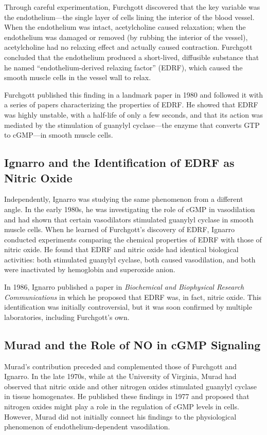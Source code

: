 Through careful experimentation, Furchgott discovered that the key variable was the endothelium---the single layer of cells lining the interior of the blood vessel. When the endothelium was intact, acetylcholine caused relaxation; when the endothelium was damaged or removed (by rubbing the interior of the vessel), acetylcholine had no relaxing effect and actually caused contraction. Furchgott concluded that the endothelium produced a short-lived, diffusible substance that he named ``endothelium-derived relaxing factor'' (EDRF), which caused the smooth muscle cells in the vessel wall to relax.

Furchgott published this finding in a landmark paper in 1980 and followed it with a series of papers characterizing the properties of EDRF. He showed that EDRF was highly unstable, with a half-life of only a few seconds, and that its action was mediated by the stimulation of guanylyl cyclase---the enzyme that converts GTP to cGMP---in smooth muscle cells.

\subsection{Ignarro and the Identification of EDRF as Nitric Oxide}

Independently, Ignarro was studying the same phenomenon from a different angle. In the early 1980s, he was investigating the role of cGMP in vasodilation and had shown that certain vasodilators stimulated guanylyl cyclase in smooth muscle cells. When he learned of Furchgott's discovery of EDRF, Ignarro conducted experiments comparing the chemical properties of EDRF with those of nitric oxide. He found that EDRF and nitric oxide had identical biological activities: both stimulated guanylyl cyclase, both caused vasodilation, and both were inactivated by hemoglobin and superoxide anion.

In 1986, Ignarro published a paper in \textit{Biochemical and Biophysical Research Communications} in which he proposed that EDRF was, in fact, nitric oxide. This identification was initially controversial, but it was soon confirmed by multiple laboratories, including Furchgott's own.

\subsection{Murad and the Role of NO in cGMP Signaling}

Murad's contribution preceded and complemented those of Furchgott and Ignarro. In the late 1970s, while at the University of Virginia, Murad had observed that nitric oxide and other nitrogen oxides stimulated guanylyl cyclase in tissue homogenates. He published these findings in 1977 and proposed that nitrogen oxides might play a role in the regulation of cGMP levels in cells. However, Murad did not initially connect his findings to the physiological phenomenon of endothelium-dependent vasodilation.

